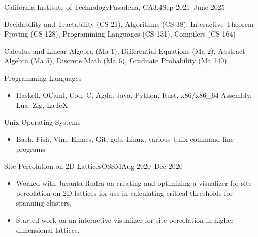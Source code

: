 \documentclass[a4paper]{article}
\begin{document}

    \begin{school}{California Institute of Technology}{Pasadena, CA}{3.4}{Sep 2021--June 2025}
        \item Decidability and Tractability (CS 21), Algorithms (CS 38), Interactive Theorem Proving (CS 128), Programming Languages (CS 131), Compilers (CS 164)
        \item Calculus and Linear Algebra (Ma 1), Differential Equations (Ma 2), Abstract Algebra (Ma 5), Discrete Math (Ma 6), Graduate Probability (Ma 140)
    \end{school}


    \begin{skill}{Programming Languages}
      \begin{itemize}[nosep]
        \item Haskell, OCaml, Coq, C, Agda, Java, Python, Rust, x86/x86\_64 Assembly, Lua, Zig, \LaTeX{}
      \end{itemize}
    \end{skill}
    \vspace{-8pt}
    \begin{skill}{Unix Operating Systems}
      \begin{itemize}[nosep]
        \item Bash, Fish, Vim, Emacs, Git, gdb, Linux, various Unix command line programs
     \end{itemize}
    \end{skill}
    \vspace{-5pt}

    \begin{activity*}{Site Percolation on 2D Lattices}{OSSM}{Aug 2020--Dec 2020}
      \begin{itemize}[topsep=5pt, partopsep=0pt, itemsep=-1pt]
        \item Worked with Jayanta Rudra on creating and optimizing a visualizer for site percolation on 2D lattices for use in calculating critical thresholds for spanning clusters.
        \item Started work on an interactive visualizer for site percolation in higher dimensional lattices.
      \end{itemize}
    \end{activity*}
\end{document}
